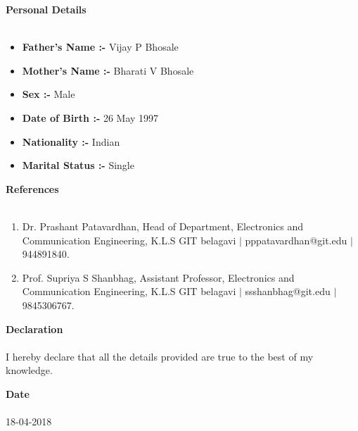 \documentclass[15pt]{article}
\begin{document}
\vspace{1mm}
\begin{flushleft}
	{\textbf{Personal Details}} \\
	\vspace{0.5mm}
	\noindent \hrulefill 
	\vspace{0.5mm} \\
	\begin{itemize}
		\item \textbf{Father's Name :-} Vijay P Bhosale
		\item \textbf{Mother's Name :-} Bharati V Bhosale
		\item \textbf{Sex :-} Male
		\item \textbf{Date of Birth :-} 26 May 1997
		\item \textbf{Nationality :-} Indian
		\item \textbf{Marital Status :-} Single
	\end{itemize}
\end{flushleft}
\vspace{1mm}
\begin{flushleft}
	{\textbf{References}} \\
	\vspace{0.5mm}
	\noindent \hrulefill 
	\vspace{0.5mm} \\
	\begin{enumerate}
		\item Dr. Prashant Patavardhan, Head of Department, Electronics and Communication Engineering, K.L.S GIT belagavi $|$ pppatavardhan@git.edu $|$ 944891840.
		\item Prof. Supriya S Shanbhag, Assistant Professor, Electronics and Communication Engineering, K.L.S GIT belagavi $|$ ssshanbhag@git.edu $|$ 9845306767.
	\end{enumerate}
\end{flushleft}
\vspace{1mm}
\begin{flushleft}
	{\textbf{Declaration}} \\
	\vspace{0.5mm}
	\noindent \hrulefill 
	\vspace{0.5mm} \\
	I hereby declare that all the details provided are true to the best of my knowledge.
\end{flushleft}
\vspace{1mm}
\begin{flushleft}
	{\textbf{Date}} \\
	\vspace{0.5mm}
	\noindent \hrulefill 
	\vspace{0.5mm} \\
	18-04-2018
\end{flushleft}
\end{document}
